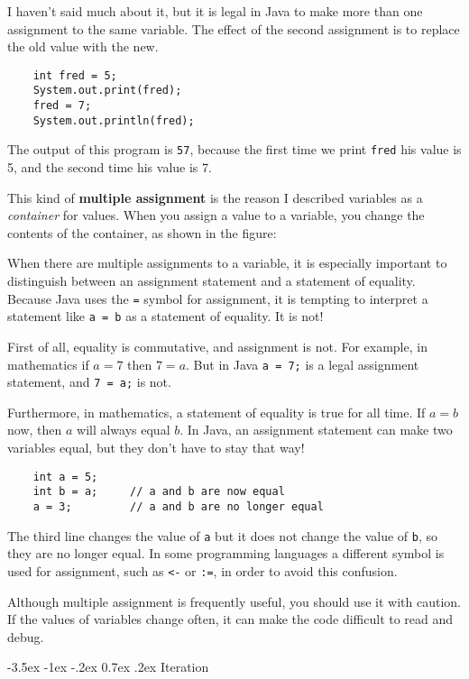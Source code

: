 \documentclass{book}
\makeatletter
\renewcommand{\section}{\@startsection 
    {section} {1} {0mm}%
    {-3.5ex \@plus -1ex \@minus -.2ex}%
    {0.7ex \@plus.2ex}%
    {\normalfont\Large\bfseries}}
\newcommand{\beforefig}{\vspace{1.3\parskip}}
\newcommand{\afterfig}{\vspace{-0.2\parskip}}
\newcommand{\myfig}[1]{
    \beforefig
    \centerline{\epsfig{#1,scale=0.8}}
    \afterfig
}
\makeatother
\begin{document}
I haven't said much about it, but it is legal in Java to
make more than one assignment to the same variable.  The
effect of the second assignment is to replace the old value
with the new.

\begin{verbatim}
    int fred = 5;
    System.out.print(fred);
    fred = 7;
    System.out.println(fred);
\end{verbatim}
%
The output of this program is {\tt 57}, because the first
time we print {\tt fred} his value is 5, and the second time
his value is 7.

This kind of {\bf multiple assignment} is the reason I
described variables as a {\em container} for values.  When
you assign a value to a variable, you change the contents of
the container, as shown in the figure:


\myfig{figure=figs/assign2.eps}


When there are multiple assignments to a variable, it is especially
important to distinguish between an assignment statement and a
statement of equality.  Because Java uses the {\tt =} symbol for
assignment, it is tempting to interpret a statement like {\tt a = b}
as a statement of equality.  It is not!

First of all, equality is commutative, and assignment is not.
For example, in mathematics if $a = 7$ then $7 = a$.  But in
Java {\tt a = 7;} is a legal assignment statement, and {\tt 7 = a;}
is not.

Furthermore, in mathematics, a statement of equality is true
for all time.  If $a = b$ now, then $a$ will always equal $b$.
In Java, an assignment statement can make two variables equal,
but they don't have to stay that way!

\begin{verbatim}
    int a = 5;
    int b = a;     // a and b are now equal
    a = 3;         // a and b are no longer equal
\end{verbatim}
%
The third line changes the value of {\tt a} but it does not
change the value of {\tt b}, so they are no longer equal.
In some programming languages a different symbol is used
for assignment, such as {\tt <-} or {\tt :=}, in order to
avoid this confusion.

Although multiple assignment is frequently useful, you should use it
with caution.  If the values of variables change often, it can make
the code difficult to read and debug.


\section{Iteration}
\end{document}
